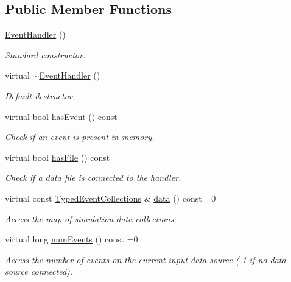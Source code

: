 \subsection*{Public Member Functions}
\begin{DoxyCompactItemize}
\item 
\hyperlink{class_d_d4hep_1_1_event_handler_a83e36ed405cced9a1dab7414b2e0fe05}{EventHandler} ()
\begin{DoxyCompactList}\small\item\em Standard constructor. \item\end{DoxyCompactList}\item 
virtual \hyperlink{class_d_d4hep_1_1_event_handler_a3decb8cd88ba8af2b9b0b0f0f2fcd722}{$\sim$EventHandler} ()
\begin{DoxyCompactList}\small\item\em Default destructor. \item\end{DoxyCompactList}\item 
virtual bool \hyperlink{class_d_d4hep_1_1_event_handler_a43ded5dfb592a8119aee05f07ca7a95b}{hasEvent} () const 
\begin{DoxyCompactList}\small\item\em Check if an event is present in memory. \item\end{DoxyCompactList}\item 
virtual bool \hyperlink{class_d_d4hep_1_1_event_handler_ab1c6611119a3c90bd83bb3bc41159498}{hasFile} () const 
\begin{DoxyCompactList}\small\item\em Check if a data file is connected to the handler. \item\end{DoxyCompactList}\item 
virtual const \hyperlink{class_d_d4hep_1_1_event_handler_a4d441ff8a824b1e2f278e8b7a6391af3}{TypedEventCollections} \& \hyperlink{class_d_d4hep_1_1_event_handler_a263d136331d72994bcbf537d4aa16d4f}{data} () const =0
\begin{DoxyCompactList}\small\item\em Access the map of simulation data collections. \item\end{DoxyCompactList}\item 
virtual long \hyperlink{class_d_d4hep_1_1_event_handler_a005436bba029439b513645485e3c0ff5}{numEvents} () const =0
\begin{DoxyCompactList}\small\item\em Access the number of events on the current input data source (-\/1 if no data source connected). \item\end{DoxyCompactList}\item 

\end{DoxyCompactItemize}
